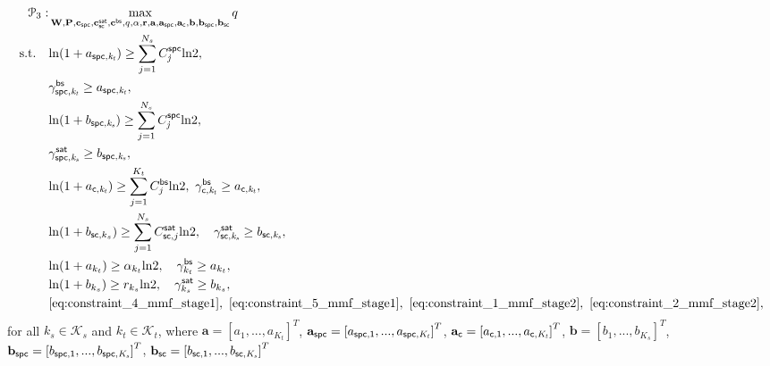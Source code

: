 \documentclass[draftclsnofoot, onecolumn, comsoc, 12pt]{IEEEtran}
\begin{document}
\begin{align} \label{eq:mmf_stage3}
\mathcal{P}_{3}:
&\mathop{{\text{max}}}_{{\bf{W}}, {\bf{P}}, {\bf{c}}_{\sf{spc}}, {\bf{c}}_{\sf{sc}}^{\sf{sat}}, {\bf{c}}^{\sf{bs}}, q, \bf{\alpha}, \bf{r}, \bf{a}, \bf{a}_{\sf{spc}}, \bf{a}_{\sf{c}}, \bf{b}, \bf{b}_{\sf{spc}}, \bf{b}_{\sf{sc}}}  q \\
{\text{s.t.}} \quad
&\mathrm{ln}(1+a_{\sf{spc},\it{k_{t}}}) \geq \sum_{j=1}^{N_{s}}C^{\sf{spc}}_{\it{j}} \mathrm{ln}2, 
\label{eq:constraint_1_mmf_stage3}  \\
&\gamma_{\sf{spc},\it{k_{t}}}^{\sf{bs}} \geq a_{\sf{spc},\it{k_{t}}},
\label{eq:constraint_2_mmf_stage3}  \\
&\mathrm{ln}(1+b_{\sf{spc},\it{k_{s}}}) \geq \sum_{j=1}^{N_{s}}C^{\sf{spc}}_{\it{j}}\mathrm{ln}2,
\label{eq:constraint_3_mmf_stage3}  \\
&\gamma_{\sf{spc},\it{k_{s}}}^{\sf{sat}} \geq b_{\sf{spc},\it{k_{s}}},
\label{eq:constraint_4_mmf_stage3}  \\
&\mathrm{ln}(1+a_{\sf{c},\it{k_{t}}}) \geq \sum_{j=1}^{K_{t}}C_{j}^{\sf{bs}} \mathrm{ln}2, \ \gamma_{\sf{c},\it{k_{t}}}^{\sf{bs}} \geq a_{\sf{c},\it{k_{t}}},
\label{eq:constraint_5_mmf_stage3}  \\
&\mathrm{ln}(1+b_{{\sf sc},k_{s}}) \geq \sum_{j=1}^{N_{s}}C_{{\sf sc},j}^{\sf{sat}} \mathrm{ln}2, \quad \gamma_{\sf{sc},\it{k_{s}}}^{\sf{sat}} \geq b_{\sf{sc},\it{k_{s}}}, 
\label{eq:constraint_6_mmf_stage3} \\
&\mathrm{ln}(1+a_{k_{t}}) \geq \alpha_{k_{t}} \mathrm{ln}2, \quad \gamma_{k_{t}}^{\sf{bs}} \geq a_{k_{t}},
\label{eq:constraint_7_mmf_stage3}  \\
&\mathrm{ln}(1+b_{k_{s}}) \geq r_{k_{s}} \mathrm{ln}2, \quad \gamma_{k_{s}}^{\sf{sat}} \geq b_{k_{s}},
\label{eq:constraint_8_mmf_stage3}  \\
&\eqref{eq:constraint_4_mmf_stage1}, \ \eqref{eq:constraint_5_mmf_stage1}, \ \eqref{eq:constraint_1_mmf_stage2}, \  \eqref{eq:constraint_2_mmf_stage2}, \nonumber
\end{align}
for all $k_{s}\in\mathcal{K}_{s}$ and $k_{t}\in\mathcal{K}_{t}$, 
where $\mathbf{a} = \left[a_{1},...,a_{K_{t}}\right]^{T}$,
$\mathbf{a}_{\sf{spc}} = \left[a_{\sf{spc},1},...,a_{\sf{spc},\it{K_{t}}}\right]^{T}$,
$\mathbf{a}_{\sf{c}} = \left[a_{\sf{c},1},...,a_{\sf{c},\it{K_{t}}}\right]^{T}$,
$\mathbf{b} = \left[b_{1},...,b_{K_{s}}\right]^{T}$,
$\mathbf{b}_{\sf{spc}} = \left[b_{\sf{spc},1},...,b_{\sf{spc},\it{K_{s}}}\right]^{T}$,
$\mathbf{b}_{\sf{sc}} = \left[b_{\sf{sc},1},...,b_{\sf{sc},\it{K_{s}}}\right]^{T}$
\end{document}
